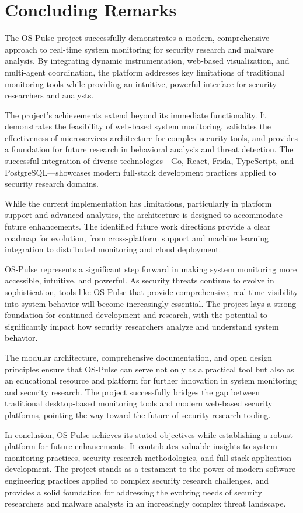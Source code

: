 \section{Concluding Remarks}

The OS-Pulse project successfully demonstrates a modern, comprehensive approach to real-time system monitoring for security research and malware analysis. By integrating dynamic instrumentation, web-based visualization, and multi-agent coordination, the platform addresses key limitations of traditional monitoring tools while providing an intuitive, powerful interface for security researchers and analysts.

The project's achievements extend beyond its immediate functionality. It demonstrates the feasibility of web-based system monitoring, validates the effectiveness of microservices architecture for complex security tools, and provides a foundation for future research in behavioral analysis and threat detection. The successful integration of diverse technologies—Go, React, Frida, TypeScript, and PostgreSQL—showcases modern full-stack development practices applied to security research domains.

While the current implementation has limitations, particularly in platform support and advanced analytics, the architecture is designed to accommodate future enhancements. The identified future work directions provide a clear roadmap for evolution, from cross-platform support and machine learning integration to distributed monitoring and cloud deployment.

OS-Pulse represents a significant step forward in making system monitoring more accessible, intuitive, and powerful. As security threats continue to evolve in sophistication, tools like OS-Pulse that provide comprehensive, real-time visibility into system behavior will become increasingly essential. The project lays a strong foundation for continued development and research, with the potential to significantly impact how security researchers analyze and understand system behavior.

The modular architecture, comprehensive documentation, and open design principles ensure that OS-Pulse can serve not only as a practical tool but also as an educational resource and platform for further innovation in system monitoring and security research. The project successfully bridges the gap between traditional desktop-based monitoring tools and modern web-based security platforms, pointing the way toward the future of security research tooling.

In conclusion, OS-Pulse achieves its stated objectives while establishing a robust platform for future enhancements. It contributes valuable insights to system monitoring practices, security research methodologies, and full-stack application development. The project stands as a testament to the power of modern software engineering practices applied to complex security research challenges, and provides a solid foundation for addressing the evolving needs of security researchers and malware analysts in an increasingly complex threat landscape.